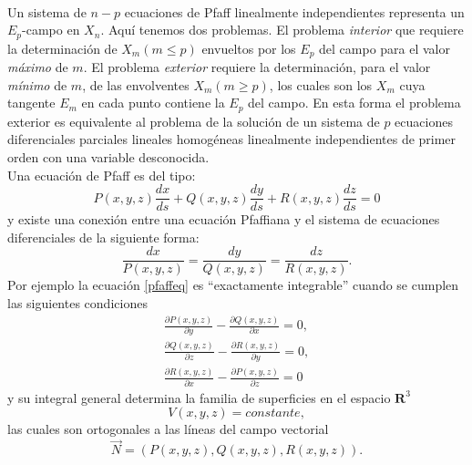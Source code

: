 \documentclass{article}
\theoremstyle{definition} \newtheorem{defi}{Definici\'on}
\theoremstyle{definition} \newtheorem{teo}{Teorema}
\theoremstyle{definition} \newtheorem{cor}{Corolario}
\begin{document}
\paragraph{}
Un sistema de $n-p$ ecuaciones de Pfaff linealmente independientes representa un $E_p$-campo en $X_n$. Aqu\'i tenemos dos problemas. El problema \emph{interior} que requiere la determinaci\'on de $X_m$$(m \le p)$ envueltos por los $E_p$ del campo para el valor \emph{m\'aximo} de $m$. El problema \emph{exterior} requiere la determinaci\'on, para el valor \emph{m\'inimo} de $m$, de las envolventes $X_m$$(m \ge p)$, los cuales son los $X_m$ cuya tangente $E_m$ en cada punto contiene la $E_p$ del campo. En esta forma el problema exterior es equivalente al problema de la soluci\'on de un sistema de $p$ ecuaciones diferenciales parciales lineales homog\'eneas linealmente independientes de primer orden con una variable desconocida.\\
Una ecuaci\'on de Pfaff es del tipo:
\begin{equation}\label{pfaffeq}
P \left(x,y,z\right) \frac{dx}{ds} + Q \left(x,y,z\right) \frac{dy}{ds} + R \left(x,y,z\right) \frac{dz}{ds} = 0
\end{equation}
y existe una conexi\'on entre una ecuaci\'on Pfaffiana y el sistema de ecuaciones diferenciales de la siguiente forma:
\begin{equation}
\frac{dx}{P \left(x,y,z\right)} = \frac{dy}{Q \left(x,y,z\right)} = \frac{dz}{R \left(x,y,z\right)}.
\end{equation}
Por ejemplo la ecuaci\'on \eqref{pfaffeq} es ``exactamente integrable'' cuando se cumplen las siguientes condiciones
\begin{align}
\frac{\partial P \left(x,y,z\right)}{\partial y} - \frac{\partial Q \left(x,y,z\right)}{\partial x} = 0, \nonumber \\
\frac{\partial Q \left(x,y,z\right)}{\partial z} - \frac{\partial R \left(x,y,z\right)}{\partial y} = 0, \nonumber \\
\frac{\partial R \left(x,y,z\right)}{\partial x} - \frac{\partial P \left(x,y,z\right)}{\partial z} = 0
\end{align}
y su integral general determina la familia de superficies en el espacio $\mathbf{R}^3$
$$V\left(x,y,z\right) = constante,$$
las  cuales son ortogonales a las l\'ineas del campo vectorial
\begin{equation}\label{vecfi}
\vec{N} =  \left(P \left(x,y,z\right),Q \left(x,y,z\right),R \left(x,y,z\right)\right).
\end{equation}
\end{document}
